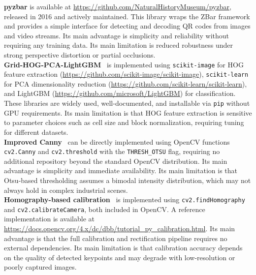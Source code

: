 \documentclass[11pt]{article}
\begin{document}
\textbf{pyzbar} is available at 
\url{https://github.com/NaturalHistoryMuseum/pyzbar}, released in 2016 and actively 
maintained. This library wraps the ZBar framework and provides a simple interface 
for detecting and decoding QR codes from images and video streams. Its main 
advantage is simplicity and reliability without requiring any training data. Its 
main limitation is reduced robustness under strong perspective distortion or partial 
occlusions.\\

\textbf{Grid-HOG-PCA-LightGBM}~\cite{Liu2024a} is implemented using 
\texttt{scikit-image} for HOG feature extraction 
(\url{https://github.com/scikit-image/scikit-image}), \texttt{scikit-learn} for 
PCA dimensionality reduction 
(\url{https://github.com/scikit-learn/scikit-learn}), and LightGBM 
(\url{https://github.com/microsoft/LightGBM}) for classification. These libraries 
are widely used, well-documented, and installable via \texttt{pip} without GPU 
requirements. Its main limitation is that HOG feature extraction is sensitive to 
parameter choices such as cell size and block normalization, requiring tuning for 
different datasets.\\

\textbf{Improved Canny}~\cite{Liu2024b} can be directly implemented using OpenCV 
functions \texttt{cv2.Canny} and \texttt{cv2.threshold} with the 
\texttt{THRESH\_OTSU} flag, requiring no additional repository beyond the standard 
OpenCV distribution. Its main advantage is simplicity and immediate availability. 
Its main limitation is that Otsu-based thresholding assumes a bimodal intensity 
distribution, which may not always hold in complex industrial scenes.\\

\textbf{Homography-based calibration}~\cite{Ding2025Homography,Zhang2024Calibration} 
is implemented using \texttt{cv2.findHomography} and \texttt{cv2.calibrateCamera}, 
both included in OpenCV. A reference implementation is available at 
\url{https://docs.opencv.org/4.x/dc/dbb/tutorial_py_calibration.html}. Its main 
advantage is that the full calibration and rectification pipeline requires no 
external dependencies. Its main limitation is that calibration accuracy depends on 
the quality of detected keypoints and may degrade with low-resolution or poorly 
captured images.\\
\end{document}
